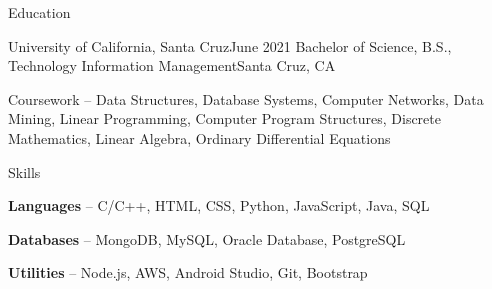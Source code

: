 \documentclass{cvtemplate}[]
\begin{document}

\begin{cvsection}{Education}

\begin{cvsubsection}
{University of California, Santa Cruz}{June 2021}
{Bachelor of Science, B.S., Technology Information Management}{Santa Cruz, CA}
\item[] Coursework -- Data Structures, Database Systems, Computer Networks, Data Mining, Linear  Programming, Computer Program Structures, Discrete Mathematics, Linear Algebra, Ordinary Differential Equations
\end{cvsubsection}

\end{cvsection}


\begin{cvsection}{Skills}

\begin{cvsubsection}
{}{}
{}{}
\item[] \textbf{Languages} -- C/C++, HTML, CSS, Python, JavaScript, Java, SQL \vsp{1pt}
\item[] \textbf{Databases} -- MongoDB, MySQL, Oracle Database, PostgreSQL \vsp{1pt}
\item[] \textbf{Utilities} -- Node.js, AWS, Android Studio, Git, Bootstrap
\end{cvsubsection}
 \vsp{1pt}
\end{cvsection}

\end{document}
